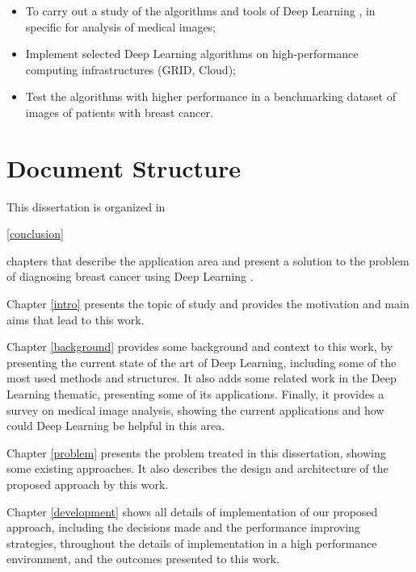 \documentclass[
  twoside,
  11pt, a4paper,
  footinclude=true,
  headinclude=true,
  cleardoublepage=empty
]{scrbook}
\begin{document}
      \begin{itemize}
        \item To carry out a study of the algorithms and tools of Deep Learning , in specific for analysis of medical images;
        \item Implement selected Deep Learning algorithms on high-performance computing infrastructures (GRID, Cloud);
        \item Test the algorithms with higher performance in a benchmarking dataset of images of patients with breast cancer.
      \end{itemize}

    \section{Document Structure} \label{intro:organization}
      This dissertation is organized in \begin{NoHyper}\ref{conclusion}\end{NoHyper} chapters that describe the application area and present a solution to the problem of diagnosing breast cancer using Deep Learning .

      Chapter \ref{intro} presents the topic of study and provides the motivation and main aims that lead to this work.

      Chapter \ref{background} provides some background and context to this work, by presenting the current state of the art of Deep Learning, including some of the most used methods and structures. It also adds some related work in the Deep Learning thematic, presenting some of its applications. Finally, it provides a survey on medical image analysis, showing the current applications and how could Deep Learning be helpful in this area.

      Chapter \ref{problem} presents the problem treated in this dissertation, showing some existing approaches. It also describes the design and architecture of the proposed approach by this work.

      Chapter \ref{development} shows all details of implementation of our proposed approach, including the decisions made and the performance improving strategies, throughout the details of implementation in a high performance environment, and the outcomes presented to this work.
\end{document}
